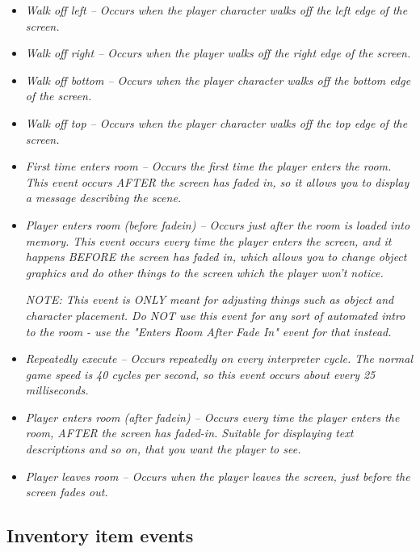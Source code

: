 \begin{itemize}
\item \it{Walk off left} -- Occurs when the player character walks off the left edge
of the screen.
\item \it{Walk off right} -- Occurs when the player walks off the right edge of the
screen.
\item \it{Walk off bottom} -- Occurs when the player character walks off the bottom
edge of the screen.
\item \it{Walk off top} -- Occurs when the player character walks off the top edge
of the screen.
\item \it{First time enters room} -- Occurs the first time the player enters the
room. This event occurs AFTER the screen has faded in, so it allows you to
display a message describing the scene.
\item \it{Player enters room (before fadein)} -- Occurs just after the room is loaded into memory.
This event occurs every time the player enters the screen, and it happens
BEFORE the screen has faded in, which allows you to change object graphics
and do other things to the screen which the player won't notice.

\it{NOTE: This event is ONLY meant for adjusting things such as object and
character placement. Do NOT use this event for any sort of automated intro
to the room - use the "Enters Room After Fade In" event for that instead.}
\item \it{Repeatedly execute} -- Occurs repeatedly on every interpreter cycle. The
normal game speed is 40 cycles per second, so this event occurs about
every 25 milliseconds.
\item \it{Player enters room (after fadein)} -- Occurs every time the player enters the
room, AFTER the screen has faded-in. Suitable for displaying text
descriptions and so on, that you want the player to see.
\item \it{Player leaves room} -- Occurs when the player leaves the screen, just
before the screen fades out.
\end{itemize}

\subsection{Inventory item events}%

